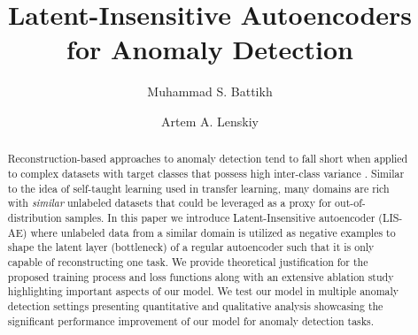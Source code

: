 \documentclass[acmtog, nonacm]{acmart}
\begin{document}
\title{Latent-Insensitive Autoencoders for Anomaly Detection}



\author{Muhammad S. Battikh}

\author{Artem A. Lenskiy}



\begin{abstract}
Reconstruction-based approaches to anomaly detection tend to fall short when applied to complex datasets with target classes that possess high inter-class variance \cite{gong2019memorizing, perera2019learning}. Similar to the idea of self-taught learning \cite{raina2007self} used in transfer learning, many domains are rich with \textit{similar} unlabeled datasets that could be leveraged as a proxy for out-of-distribution samples. In this paper we introduce Latent-Insensitive autoencoder (LIS-AE) where unlabeled data from a similar domain is utilized as negative examples to shape the latent layer (bottleneck) of a regular autoencoder such that it is only capable of reconstructing one task. 
We provide theoretical justification for the proposed training process and loss functions along with an extensive ablation study highlighting important aspects of our model. We test our model in multiple anomaly detection settings presenting quantitative and qualitative analysis showcasing the significant performance improvement of our model for anomaly detection tasks.

\end{abstract}












\maketitle
\end{document}
